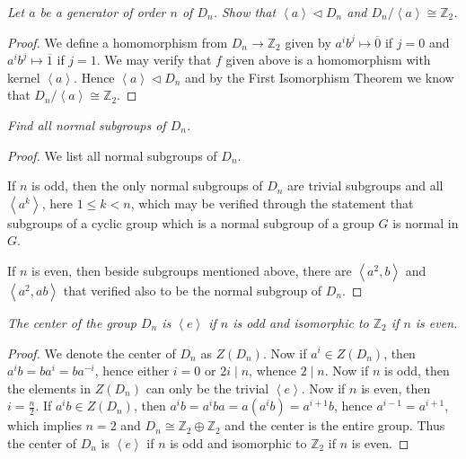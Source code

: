 \begin{problem}\em
Let $a$ be a generator of order $n$ of $D_n$. Show that $\left<a\right>\lhd D_n$ and $D_n/\left<a\right>\cong\mathbb{Z}_2$.
\end{problem}
\begin{proof}
We define a homomorphism from $D_n\to\mathbb{Z}_2$ given by $a^ib^j\mapsto \overline{0}$ if $j=0$ and $a^ib^j\mapsto\overline{1}$ if $j=1$. We may verify that $f$ given above is a homomorphism with kernel $\left<a\right>$. Hence $\left<a\right>\lhd D_n$ and by the First Isomorphism Theorem we know that $D_n/\left<a\right>\cong\mathbb{Z}_2$.
\end{proof}
\begin{problem}\em
Find all normal subgroups of $D_n$.
\end{problem}
\begin{proof}
We list all normal subgroups of $D_n$.\par
If $n$ is odd, then the only normal subgroups of $D_n$ are trivial subgroups and all $\left<a^k\right>$, here $1\le k<n$, which may be verified through the statement that subgroups of a cyclic group which is a normal subgroup of a group $G$ is normal in $G$.\par
If $n$ is even, then beside subgroups mentioned above, there are $\left<a^2,b\right>$ and $\left<a^2,ab\right>$ that verified also to be the normal subgroup of $D_n$.
\end{proof}
\begin{problem}\em
The center of the group $D_n$ is $\left<e\right>$ if $n$ is odd and isomorphic to $\mathbb{Z}_2$ if $n$ is even.
\end{problem}
\begin{proof}
We denote the center of $D_n$ as $Z(D_n)$. Now if $a^i\in Z(D_n)$, then $a^ib=ba^i=ba^{-i}$, hence either $i=0$ or $2i\mid n$, whence $2\mid n$. Now if $n$ is odd, then the elements in $Z(D_n)$ can only be the trivial $\left<e\right>$. Now if $n$ is even, then $i=\frac{n}{2}$. If $a^ib\in Z(D_n)$, then $a^ib=a^iba=a(a^ib)=a^{i+1}b$, hence $a^{i-1}=a^{i+1}$, which implies $n=2$ and $D_n\cong\mathbb{Z}_2\oplus\mathbb{Z}_2$ and the center is the entire group. Thus the center of $D_n$ is $\left<e\right>$ if $n$ is odd and isomorphic to $\mathbb{Z}_2$ if $n$ is even.
\end{proof}
